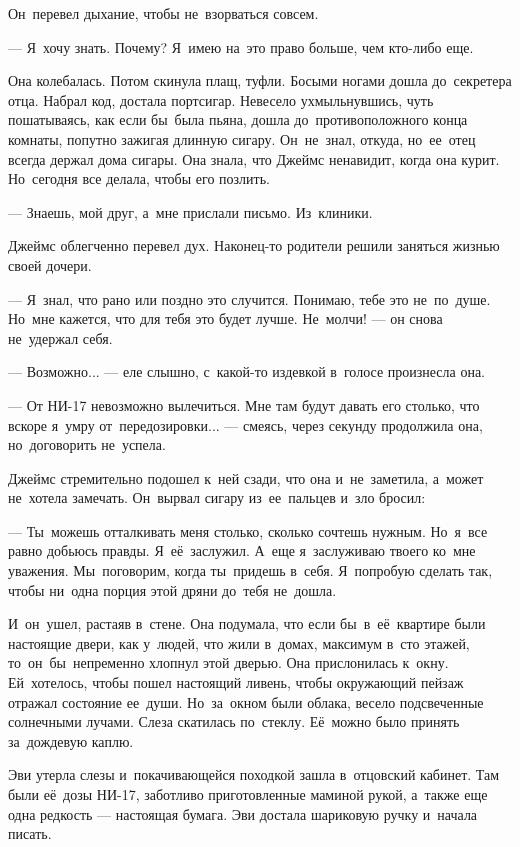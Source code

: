 Он~перевел дыхание, чтобы не~взорваться совсем.
 
 --- Я~хочу знать.
Почему? Я~имею на~это право больше, чем кто-либо еще.

Она колебалась.
Потом скинула плащ, туфли.
Босыми ногами дошла до~секретера отца.
Набрал код, достала портсигар.
Невесело ухмыльнувшись, чуть пошатываясь, как если бы~была пьяна, дошла до~противоположного конца комнаты, попутно зажигая длинную сигару.
Он~не~знал, откуда, но~ее~отец всегда держал дома сигары.
Она знала, что Джеймс ненавидит, когда она курит.
Но~сегодня все делала, чтобы его позлить.
 
 --- Знаешь, мой друг, а~мне прислали письмо.
Из~клиники.
 
Джеймс облегченно перевел дух.
Наконец-то родители решили заняться жизнью своей дочери.
 
 --- Я~знал, что рано или поздно это случится.
Понимаю, тебе это не~по~душе.
Но~мне кажется, что для тебя это будет лучше.
Не~молчи! --- он снова не~удержал себя.
 
 --- Возможно... --- еле слышно, с~какой-то издевкой в~голосе произнесла она.
 
 --- От НИ-17 невозможно вылечиться. Мне там будут давать его столько, что вскоре я~умру от~передозировки... --- смеясь, через секунду продолжила она, но~договорить не~успела.
 
Джеймс стремительно подошел к~ней сзади, что она и~не~заметила, а~может не~хотела замечать.
Он~вырвал сигару из~ее~пальцев и~зло бросил:

 --- Ты~можешь отталкивать меня столько, сколько сочтешь нужным.
Но~я~все равно добьюсь правды.
Я~её~заслужил.
А~еще я~заслуживаю твоего ко~мне уважения.
Мы~поговорим, когда ты~придешь в~себя.
Я~попробую сделать так, чтобы ни~одна порция этой дряни до~тебя не~дошла.

И~он~ушел, растаяв в~стене.
Она подумала, что если бы~в~её~квартире были настоящие двери, как у~людей, что жили в~домах, максимум в~сто этажей, то~он~бы~непременно хлопнул этой дверью.
Она прислонилась к~окну.
Ей~хотелось, чтобы пошел настоящий ливень, чтобы окружающий пейзаж отражал состояние ее~души.
Но~за~окном были облака, весело подсвеченные солнечными лучами.
Слеза скатилась по~стеклу.
Её~можно было принять за~дождевую каплю.
 
Эви утерла слезы и~покачивающейся походкой зашла в~отцовский кабинет.
Там были её~дозы НИ-17, заботливо приготовленные маминой рукой, а~также еще одна редкость --- настоящая бумага.
Эви достала шариковую ручку и~начала писать.
 

